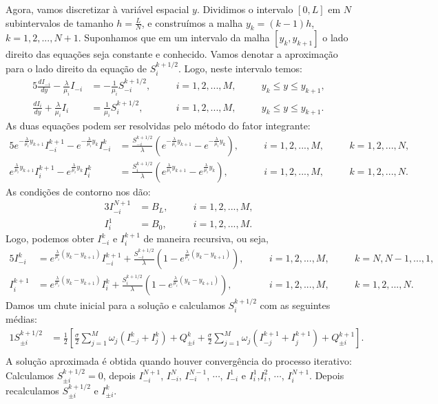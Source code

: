 Agora, vamos discretizar à variável espacial $y$. Dividimos o intervalo $[0,L]$ em $N$ subintervalos de tamanho $h=\frac{L}{N}$, e construímos a malha $y_k=(k-1)h$, $k=1,2,...,N+1$. Suponhamos que em um intervalo da malha $[y_k,y_{k+1}]$ o lado direito das equações seja constante e conhecido. Vamos denotar a aproximação para o lado direito da equação de $S_{i}^{k+1/2}$. Logo, neste intervalo temos:
\begin{alignat*}{5}
\frac{dI_{-i}}{d y} -\frac{\lambda}{\mu_i}I_{-i}&=-\frac{1}{\mu_i}S_{-i}^{k+1/2}, &\quad &i=1,2,...,M, &\quad &y_k \leq y \leq y_{k+1},\\
\frac{dI_{i}}{d y} +\frac{\lambda}{\mu_i}I_{i}&=\frac{1}{\mu_i}S_{i}^{k+1/2}, & &i=1,2,...,M, & &y_k \leq y \leq y_{k+1}.
\end{alignat*}
As duas equações podem ser resolvidas pelo método do fator integrante:
\begin{alignat*}{5}
e^{-\frac{\lambda}{\mu_i }y_{k+1}} I_{-i}^{k+1}-e^{-\frac{\lambda}{\mu_i }y_k} I_{-i}^k &=\frac{S_{-i}^{k+1/2}}{\lambda}\left(e^{-\frac{\lambda}{\mu_i }y_{k+1}}-e^{-\frac{\lambda}{\mu_i }y_k}\right), &\quad &i=1,2,...,M, &\quad &k=1,2,...,N,\\
e^{\frac{\lambda}{\mu_i }y_{k+1}} I_{i}^{k+1}-e^{\frac{\lambda}{\mu_i }y_k} I_{i}^k &=\frac{S_{i}^{k+1/2}}{\lambda}\left(e^{\frac{\lambda}{\mu_i }y_{k+1}}-e^{\frac{\lambda}{\mu_i }y_k}\right), & &i=1,2,...,M, & &k=1,2,...,N.
\end{alignat*}
As condições de contorno nos dão:
\begin{alignat*}{3}
I_{-i}^{N+1}&=  B_L, &\quad &i=1,2,...,M,\\
I_i^1&= B_0, & &i=1,2,...,M.
\end{alignat*}
Logo, podemos obter $I_{-i}^{k}$ e $I_{i}^{k+1}$ de maneira recursiva, ou seja,
\begin{alignat*}{5}
I_{-i}^{k}&=e^{\frac{\lambda}{\mu_i }(y_k-y_{k+1})} I_{-i}^{k+1}+\frac{S_{-i}^{k+1/2}}{\lambda}\left(1-e^{\frac{\lambda}{\mu_i }(y_k-y_{k+1})}\right),&\quad &i=1,2,...,M, &\quad &k=N,N-1,...,1,\\
I_{i}^{k+1}&=e^{\frac{\lambda}{\mu_i }(y_k-y_{k+1})} I_{i}^{k}+\frac{S_{i}^{k+1/2}}{\lambda}\left(1-e^{\frac{\lambda}{\mu_i }(y_k-y_{k+1})}\right), & &i=1,2,...,M, & &k=1,2,...,N.
\end{alignat*}
Damos um chute inicial para a solução e calculamos $S_{i}^{k+1/2}$ com as seguintes médias:
\begin{alignat*}{1}
S_{\pm i}^{k+1/2}&=\frac{1}{2}\left[\frac{\sigma}{2}\sum_{j=1}^{M}\omega_j(I_{-j}^{k}+I_{j}^{k})+Q_{\pm i}^{k}+\frac{\sigma}{2}\sum_{j=1}^{M}\omega_j(I_{-j}^{k+1}+I_{j}^{k+1})+Q_{\pm i}^{k+1}\right].\\
\end{alignat*}
A solução aproximada é obtida quando houver convergência do processo iterativo: Calculamos $S_{\pm i}^{k+1/2}=0$, depois $I_{-i}^{N+1}$, $I_{-i}^{N}$, $I_{-i}^{N-1}$, $\cdots$, $I_{-i}^{1}$ e $I_{i}^{1}$,$I_{i}^{2}$, $\cdots$, $I_{i}^{N+1}$. Depois recalculamos $S_{\pm i}^{k+1/2}$ e $I_{\pm i}^{k}$.

